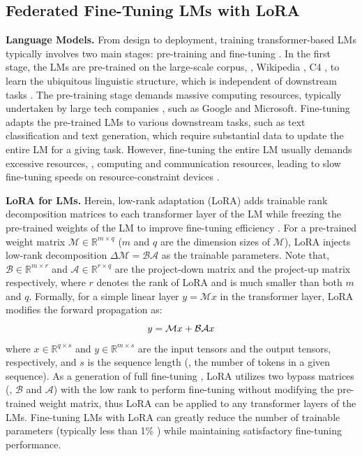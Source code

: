 \vspace{-0.2cm}
\subsection{Federated Fine-Tuning LMs with LoRA}
\vspace{-0.1cm}
\textbf{Language Models.}
From design to deployment, training transformer-based LMs typically involves two main stages: pre-training and fine-tuning \cite{vaswani2017attention, lin2021fednlp, cai2022fedadapter}.
In the first stage, the LMs are pre-trained on the large-scale corpus, \eg, Wikipedia \cite{wikidump}, C4 \cite{2019t5}, to learn the ubiquitous linguistic structure, which is independent of downstream tasks \cite{cai2022fedadapter}.
The pre-training stage demands massive computing resources, typically undertaken by large tech companies \cite{devlin2018bert, brown2020language}, such as Google and Microsoft.
Fine-tuning adapts the pre-trained LMs to various downstream tasks, such as text classification and text generation, which require substantial data to update the entire LM for a giving task.
However, fine-tuning the entire LM usually demands excessive resources, \eg, computing and communication resources, leading to slow fine-tuning speeds on resource-constraint devices \cite{cai2022fedadapter, xu2023federated}.

\textbf{LoRA for LMs.}
Herein, low-rank adaptation (LoRA) adds trainable rank decomposition matrices to each transformer layer of the LM while freezing the pre-trained weights of the LM to improve fine-tuning efficiency \cite{hu2021lora}. 
For a pre-trained weight matrix $\mathcal{M} \in \mathbb{R}^{m \times q}$ ($m$ and $q$ are the dimension sizes of $\mathcal{M}$), LoRA injects low-rank decomposition $\Delta \mathcal{M} = \mathcal{B}\mathcal{A}$ as the trainable parameters. 
Note that, $\mathcal{B} \in \mathbb{R}^{m \times r}$ and $\mathcal{A} \in \mathbb{R}^{r \times q}$ are the project-down matrix and the project-up matrix respectively, where $r$ denotes the rank of LoRA and is much smaller than both $m$ and $q$.
Formally, for a simple linear layer $y = \mathcal{M}x$ in the transformer layer, LoRA modifies the forward propagation as: 
\begin{equation}
    y = \mathcal{M}x + \mathcal{B}\mathcal{A}x
    \vspace{-0.1cm}
\end{equation}
where $x \in \mathbb{R}^{q \times s}$ and $y \in \mathbb{R}^{m \times s}$ are the input tensors and the output tensors, respectively, and $s$ is the sequence length (\ie, the number of tokens in a given sequence). 
As a generation of full fine-tuning \cite{hu2021lora}, LoRA utilizes two bypass matrices (\ie, $\mathcal{B}$ and $\mathcal{A}$) with the low rank to perform fine-tuning without modifying the pre-trained weight matrix, thus LoRA can be applied to any transformer layers of the LMs.
Fine-tuning LMs with LoRA can greatly reduce the number of trainable parameters (typically less than 1\% \cite{hu2021lora, zhang2023fedpetuning}) while maintaining satisfactory fine-tuning performance.


